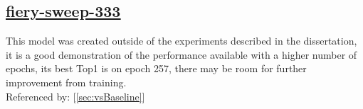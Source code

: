 \documentclass[11pt]{report}
\begin{document}
\subsection*{\protect\href{https://wandb.ai/samfh/Resnet56-Filters-Test/runs/a09xglnd/overview?workspace=}{\underline{\color{blue}fiery-sweep-333}}}\label{sec:fiery-sweep-333}
This model was created outside of the experiments described in the dissertation, it is a good demonstration of the performance available with a higher number of epochs, its best Top1 is on epoch 257, there may be room for further improvement from training. \\
Referenced by: [\ref{sec:vsBaseline}]
\begin{figure}[H]
    \begin{table}[H]
        \centering
        \hspace{2em}
    \end{table}    
\end{figure}
\end{document}
